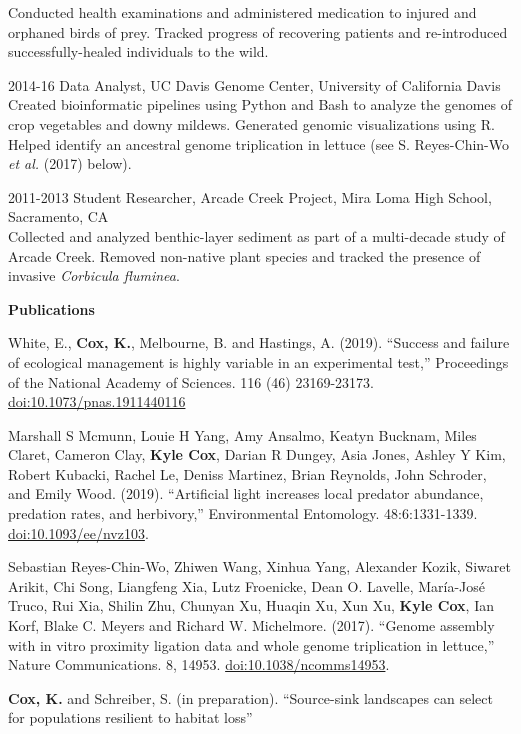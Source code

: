 \documentclass[letterpaper,12pt]{article}
\begin{document}
\begin{itemize}
\begin{deflist}
		Conducted health examinations and administered medication to injured and orphaned birds of prey. Tracked progress of recovering patients and re-introduced successfully-healed individuals to the wild.\smallskip
		\item [2014-16] Data Analyst, UC Davis Genome Center, University of California Davis\smallskip\\
		Created bioinformatic pipelines using Python and Bash to analyze the genomes of crop vegetables and downy mildews. Generated genomic visualizations using R. Helped identify an ancestral genome triplication in lettuce (see S. Reyes-Chin-Wo \textit{et al.} (2017) below).\smallskip
		\item [2011-2013] Student Researcher, Arcade Creek Project, Mira Loma High School, Sacramento, CA\smallskip\\
		Collected and analyzed benthic-layer sediment as part of a multi-decade study of Arcade Creek. Removed non-native plant species and tracked the presence of invasive \textit{Corbicula fluminea}.
	\end{deflist}
\end{itemize}
\vspace*{1\baselineskip}
\textbf{Publications}\medskip

\begin{hangparas}{3em}{1}
White, E., \textbf{Cox, K.}, Melbourne, B. and Hastings, A. (2019). ``Success and failure of ecological management is highly variable in an experimental test,'' Proceedings of the National Academy of Sciences. 116 (46) 23169-23173. \href{https://doi.org/10.1073/pnas.1911440116}{doi:10.1073/pnas.1911440116}

Marshall S Mcmunn, Louie H Yang, Amy Ansalmo, Keatyn Bucknam, Miles Claret, Cameron Clay, \textbf{Kyle Cox}, Darian R Dungey, Asia Jones, Ashley Y Kim, Robert Kubacki, Rachel Le, Deniss Martinez, Brian Reynolds, John Schroder, and Emily Wood. (2019). ``Artificial light increases local predator abundance, predation rates, and herbivory,'' Environmental Entomology. 48:6:1331-1339. \href{https://doi.org/10.1093/ee/nvz103}{doi:10.1093/ee/nvz103}.

Sebastian Reyes-Chin-Wo, Zhiwen Wang, Xinhua Yang, Alexander Kozik, Siwaret Arikit, Chi Song, Liangfeng Xia, Lutz Froenicke, Dean O. Lavelle, María-José Truco, Rui Xia, Shilin Zhu, Chunyan Xu, Huaqin Xu, Xun Xu, \textbf{Kyle Cox}, Ian Korf, Blake C. Meyers and Richard W. Michelmore. (2017). ``Genome assembly with in vitro proximity ligation data and whole genome triplication in lettuce,'' Nature Communications. 8, 14953. \href{https://www.nature.com/articles/ncomms14953}{doi:10.1038/ncomms14953}.

\textbf{Cox, K.} and Schreiber, S. (in preparation). ``Source-sink landscapes can select for populations resilient to habitat loss''\\
\vspace*{1\baselineskip}
\end{hangparas}
\end{document}
